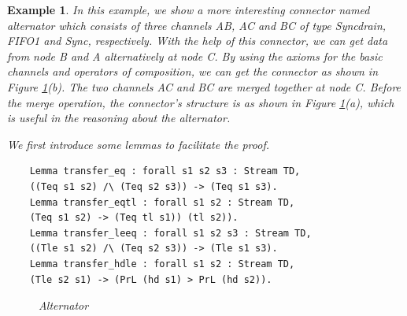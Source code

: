 \documentclass[3p,times]{elsarticle}
\newtheorem{example}{Example}[section]
\begin{document}
\begin{example}\label{ex:alternator}
In this example, we show a more interesting connector named \emph{alternator} which consists of three channels \emph{AB}, \emph{AC} and \emph{BC} of type Syncdrain, FIFO1 and Sync, respectively. With the help of this connector, we can get data from node \emph{B} and \emph{A} alternatively at node \emph{C}.
By using the axioms for the basic channels and operators of composition, we can get the connector as shown in Figure \ref{fig:alternator}(b). The two
channels \emph{AC} and \emph{BC} are merged together at node \emph{C}. Before the merge operation, the connector's structure is as shown in
Figure \ref{fig:alternator}(a), which is useful in the reasoning about the alternator.


We first introduce some lemmas to facilitate the proof.
\begin{verbatim}
    Lemma transfer_eq : forall s1 s2 s3 : Stream TD,
    ((Teq s1 s2) /\ (Teq s2 s3)) -> (Teq s1 s3).
    Lemma transfer_eqtl : forall s1 s2 : Stream TD,
    (Teq s1 s2) -> (Teq tl s1)) (tl s2)).
    Lemma transfer_leeq : forall s1 s2 s3 : Stream TD,
    ((Tle s1 s2) /\ (Teq s2 s3)) -> (Tle s1 s3).
    Lemma transfer_hdle : forall s1 s2 : Stream TD,
    (Tle s2 s1) -> (PrL (hd s1) > PrL (hd s2)).
\end{verbatim}

\begin{figure}
\vspace{0cm}
\centering
{}
\caption{Alternator}
\label{fig:alternator}
\end{figure}


\end{example}
\end{document}
